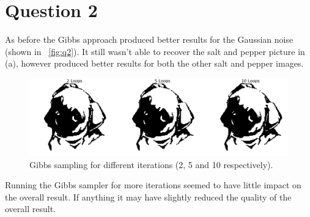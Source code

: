 \documentclass[]{article}
\begin{document}
    \section*{Question 2}
        \par
        As before the Gibbs approach produced better results for the Gaussian noise (shown in ~\ref{fig:q2}). It still wasn't able to recover the salt and pepper picture in (a), however produced better results for both the other salt and pepper images.
        \begin{figure}[h]
            \centering
            \includegraphics[width=0.5\linewidth]{output_7_1.png}
            \caption{Gibbs sampling for different iterations (2, 5 and 10 respectively).}
            \label{fig:q2a}
        \end{figure}
        \par
        Running the Gibbs sampler for more iterations seemed to have little impact on the overall result. If anything it may have slightly reduced the quality of the overall result.
\end{document}
